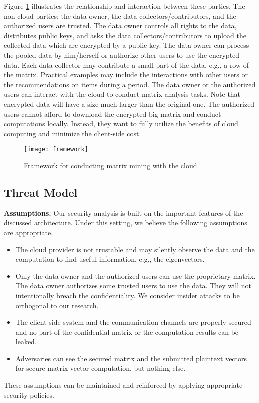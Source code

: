 \documentclass[10pt, conference, compsocconf]{IEEEtran}
\begin{document}
Figure \ref{fig:framework} illustrates the relationship and interaction between these parties. The non-cloud parties: the data owner, the data collectors/contributors, and the authorized users are trusted. The data owner controls all rights to the data, distributes public keys, and asks the data collectors/contributors to upload the collected data which are encrypted by a public key. The data owner can process the pooled data by him/herself or authorize other users to use the encrypted data. Each data collector may contribute a small part of the data, e.g., a row of the matrix. Practical examples may include the interactions with other users or the recommendations on items during a period. The data owner or the authorized users can interact with the cloud to conduct matrix analysis tasks. Note that encrypted data will have a size much larger than the original one. The authorized users cannot afford to download the encrypted big matrix and conduct computations locally. Instead, they want to fully utilize the benefits of cloud computing and minimize the client-side cost. 
\begin{figure}[tbh]
\centering
\begin{minipage}{\linewidth}
\centering
\texttt{[image: framework]}
\caption{Framework for conducting matrix mining with the cloud.}\label{fig:framework}
\end{minipage}
\end{figure}

\subsection{Threat Model}

\textbf{Assumptions.} Our security analysis is built on the important features of the discussed architecture. Under this setting, we believe the following assumptions are appropriate. 
\begin{itemize}
\item The cloud provider is not trustable and may silently observe the data and the computation to find useful information, e.g., the eigenvectors.
\item Only the data owner and the authorized users can use the proprietary matrix. The data owner authorizes some trusted users to use the data. They will not intentionally breach the confidentiality. We consider insider attacks to be orthogonal to our research.\item The client-side system and the communication channels are properly secured and no part of the confidential matrix or the computation results can be leaked. 
\item Adversaries can see the secured matrix and the submitted plaintext vectors for secure matrix-vector computation, but nothing else.
\end{itemize}
These assumptions can be maintained and reinforced by applying appropriate security policies. 
\end{document}
